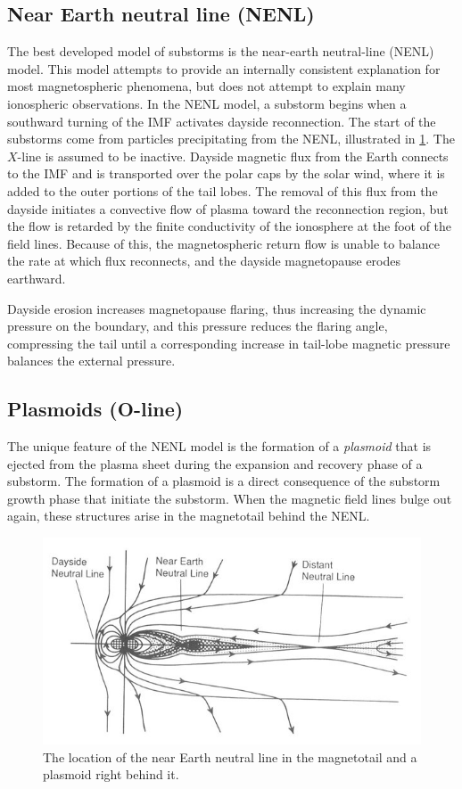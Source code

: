 \subsection{Near Earth neutral line (NENL)}
The best developed model of substorms is the near-earth neutral-line (NENL) model. This model attempts to provide an internally consistent explanation for most magnetospheric phenomena, but does not attempt to explain many ionospheric observations. In the NENL model, a substorm begins when a southward turning of the IMF activates dayside reconnection. The start of the substorms come from particles precipitating from the NENL, illustrated in \cref{fig:L8_NENL_plasmoids}. The \(X\)-line is assumed to be inactive. Dayside magnetic flux from the Earth connects to the IMF and is transported over the polar caps by the solar wind, where it is added to the outer portions of the tail lobes. The removal of this flux from the dayside initiates a convective flow of plasma toward the reconnection region, but the flow is retarded by the finite conductivity of the ionosphere at the foot of the field lines. Because of this, the magnetospheric return flow is unable to balance the rate at which flux reconnects, and the dayside magnetopause erodes earthward.

Dayside erosion increases magnetopause flaring, thus increasing the dynamic pressure on the boundary, and this pressure reduces the flaring angle, compressing the tail until a corresponding increase in tail-lobe magnetic pressure balances the external pressure.

\subsection{Plasmoids (O-line)}
The unique feature of the NENL model is the formation of a \emph{plasmoid} that is ejected from the plasma sheet during the expansion and recovery phase of a substorm. The formation of a plasmoid is a direct consequence of the substorm growth phase that initiate the substorm. When the magnetic field lines bulge out again, these structures arise in the magnetotail behind the NENL\@.
\begin{figure}[t]
    \centering
    \includegraphics[width=.7\linewidth]{bilder/L8_NENL_plasmoids.jpeg}
    \caption{The location of the near Earth neutral line in the magnetotail and a plasmoid right behind it.}\label{fig:L8_NENL_plasmoids}
\end{figure}

